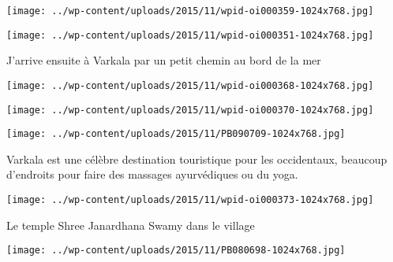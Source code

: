  

\begin{center} \texttt{[image: ../wp-content/uploads/2015/11/wpid-oi000359-1024x768.jpg]} \end{center}

 

 

\begin{center} \texttt{[image: ../wp-content/uploads/2015/11/wpid-oi000351-1024x768.jpg]} \end{center}

 

 J'arrive ensuite à Varkala par un petit chemin au bord de la mer 

 

\begin{center} \texttt{[image: ../wp-content/uploads/2015/11/wpid-oi000368-1024x768.jpg]} \end{center}

 

 

\begin{center} \texttt{[image: ../wp-content/uploads/2015/11/wpid-oi000370-1024x768.jpg]} \end{center}

 

 

\begin{center} \texttt{[image: ../wp-content/uploads/2015/11/PB090709-1024x768.jpg]} \end{center}

 

 Varkala est une célèbre destination touristique pour les occidentaux, beaucoup d'endroits pour faire des massages ayurvédiques ou du yoga. 

 

\begin{center} \texttt{[image: ../wp-content/uploads/2015/11/wpid-oi000373-1024x768.jpg]} \end{center}

 

 Le temple Shree Janardhana Swamy dans le village 

 

\begin{center} \texttt{[image: ../wp-content/uploads/2015/11/PB080698-1024x768.jpg]} \end{center}

